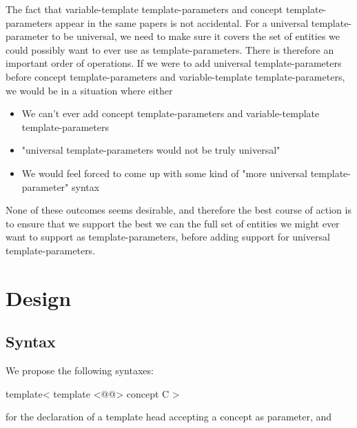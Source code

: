 \documentclass{wg21}
\begin{document}
The fact that variable-template template-parameters and concept template-parameters appear in the same papers is not accidental.
For a universal template-parameter to be universal, we need to make sure it covers the set of entities we could possibly want to ever use as template-parameters.
There is therefore an important order of operations.
If we were to add universal template-parameters before concept template-parameters and variable-template template-parameters, we would be in a situation where either
\begin{itemize}
\item We can't ever add concept template-parameters and variable-template template-parameters
\item "universal template-parameters would not be truly universal"
\item We would feel forced to come up with some kind of "more universal template-parameter" syntax
\end{itemize}

None of these outcomes seems desirable, and therefore the best course of action is to ensure that we
support the best we can the full set of entities we might ever want to support as template-parameters, before adding support for universal template-parameters.

\section{Design}

%

\subsection{Syntax}

We propose the following syntaxes:

\begin{colorblock}
template<
    template <@@> concept C
>
\end{colorblock}

for the declaration of a template head accepting a concept as parameter, and
\end{document}
